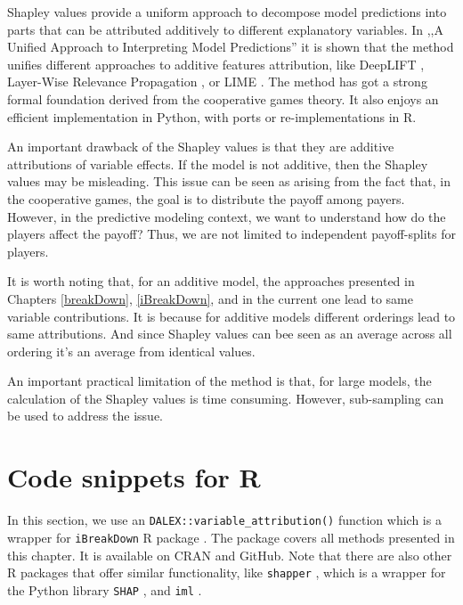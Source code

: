 \documentclass[]{krantz}
\begin{document}
Shapley values provide a uniform approach to decompose model predictions into parts that can be attributed additively to different explanatory variables. In ,,A Unified Approach to Interpreting Model Predictions'' \citep{SHAP} it is shown that the method unifies different approaches to additive features attribution, like DeepLIFT \citep{DeepLIFT}, Layer-Wise Relevance Propagation \citep{LWRP}, or LIME \citep{lime}. The method has got a strong formal foundation derived from the cooperative games theory. It also enjoys an efficient implementation in Python, with ports or re-implementations in R.

An important drawback of the Shapley values is that they are additive attributions of variable effects. If the model is not additive, then the Shapley values may be misleading. This issue can be seen as arising from the fact that, in the cooperative games, the goal is to distribute the payoff among payers. However, in the predictive modeling context, we want to understand how do the players affect the payoff? Thus, we are not limited to independent payoff-splits for players.

It is worth noting that, for an additive model, the approaches presented in Chapters \ref{breakDown}, \ref{iBreakDown}, and in the current one lead to same variable contributions. It is because for additive models different orderings lead to same attributions. And since Shapley values can bee seen as an average across all ordering it's an average from identical values.

An important practical limitation of the method is that, for large models, the calculation of the Shapley values is time consuming. However, sub-sampling can be used to address the issue.

\hypertarget{SHAPRcode}{%
\section{Code snippets for R}\label{SHAPRcode}}

In this section, we use an \texttt{DALEX::variable\_attribution()} function which is a wrapper for \texttt{iBreakDown} R package \citep{iBreakDownRPackage}. The package covers all methods presented in this chapter. It is available on CRAN and GitHub.
Note that there are also other R packages that offer similar functionality, like \texttt{shapper} \citep{shapperPackage}, which is a wrapper for the Python library \texttt{SHAP} \citep{shapPackage}, and \texttt{iml} \citep{imlRPackage}.
\end{document}
